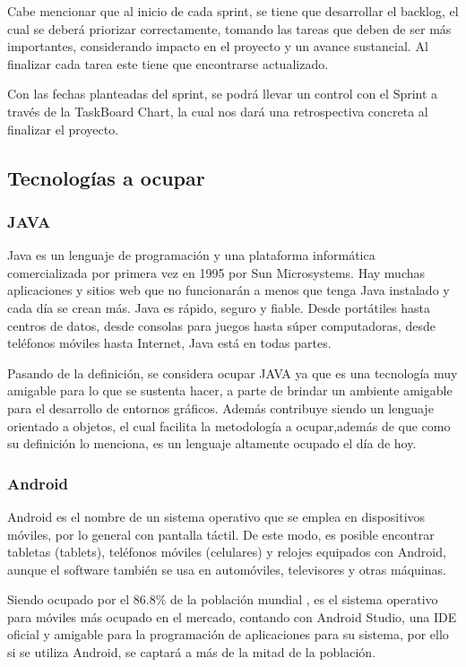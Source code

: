 \documentclass[10pt]{article}
\begin{document}
\newpage 
Cabe mencionar que al inicio de cada sprint, se tiene que desarrollar el backlog, el cual se deberá priorizar correctamente, tomando las tareas que deben de ser más importantes, considerando impacto en el proyecto y un avance sustancial. Al finalizar cada tarea este tiene que encontrarse actualizado.

Con las fechas planteadas del sprint, se podrá llevar un control con el Sprint a través de la TaskBoard Chart, la cual nos dará una retrospectiva concreta al finalizar el proyecto.

\newpage 
\subsection{Tecnologías a ocupar}
\subsubsection{JAVA}
Java es un lenguaje de programación y una plataforma informática comercializada por primera vez en 1995 por Sun Microsystems. Hay muchas aplicaciones y sitios web que no funcionarán a menos que tenga Java instalado y cada día se crean más. Java es rápido, seguro y fiable. Desde portátiles hasta centros de datos, desde consolas para juegos hasta súper computadoras, desde teléfonos móviles hasta Internet, Java está en todas partes\cite{IEEEreferencias:Ref40}.

Pasando de la definición, se considera ocupar JAVA ya que es una tecnología muy amigable para lo que se sustenta hacer, a parte de brindar un ambiente amigable para el desarrollo de entornos gráficos. Además contribuye siendo un lenguaje orientado a objetos, el cual facilita la metodología a ocupar,además de que como su definición lo menciona, es un lenguaje altamente ocupado el día de hoy.

\subsubsection{Android}
Android es el nombre de un sistema operativo que se emplea en dispositivos móviles, por lo general con pantalla táctil. De este modo, es posible encontrar tabletas (tablets), teléfonos móviles (celulares) y relojes equipados con Android, aunque el software también se usa en automóviles, televisores y otras máquinas\cite{IEEEreferencias:Ref41}.

Siendo ocupado por el 86.8\% de la población mundial \cite{IEEEreferencias:Ref42}, es el sistema operativo para móviles más ocupado en el mercado, contando con Android Studio, una IDE oficial y amigable para la programación de aplicaciones para su sistema, por ello si se utiliza Android, se captará a más de la mitad de la población.
\end{document}
